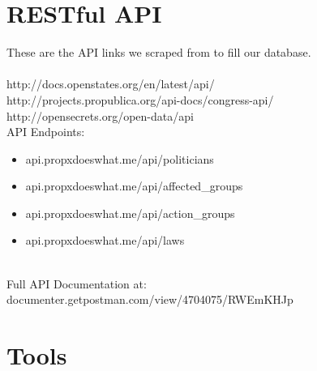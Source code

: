 \documentclass[12pt]{article}
\begin{document}
\section{RESTful API}
These are the API links we scraped from to fill our database.\\ \\http://docs.openstates.org/en/latest/api/ \\http://projects.propublica.org/api-docs/congress-api/ \\http://opensecrets.org/open-data/api\\

API Endpoints: \\

\begin{itemize}
	\item api.propxdoeswhat.me/api/politicians
	\item api.propxdoeswhat.me/api/affected\_groups
	\item api.propxdoeswhat.me/api/action\_groups
	\item api.propxdoeswhat.me/api/laws
\end{itemize}

~\\
Full API Documentation at: documenter.getpostman.com/view/4704075/RWEmKHJp

\section{Tools}
\end{document}
